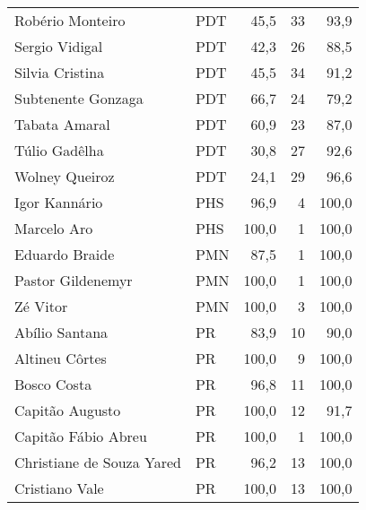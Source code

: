 \begin{longtable}{llrrr}
                    Robério Monteiro &            PDT &      45,5 &           33 &       93,9 \\
                      Sergio Vidigal &            PDT &      42,3 &           26 &       88,5 \\
                     Silvia Cristina &            PDT &      45,5 &           34 &       91,2 \\
                  Subtenente Gonzaga &            PDT &      66,7 &           24 &       79,2 \\
                       Tabata Amaral &            PDT &      60,9 &           23 &       87,0 \\
                       Túlio Gadêlha &            PDT &      30,8 &           27 &       92,6 \\
                      Wolney Queiroz &            PDT &      24,1 &           29 &       96,6 \\
                       Igor Kannário &            PHS &      96,9 &            4 &      100,0 \\
                         Marcelo Aro &            PHS &     100,0 &            1 &      100,0 \\
                      Eduardo Braide &            PMN &      87,5 &            1 &      100,0 \\
                   Pastor Gildenemyr &            PMN &     100,0 &            1 &      100,0 \\
                            Zé Vitor &            PMN &     100,0 &            3 &      100,0 \\
                      Abílio Santana &             PR &      83,9 &           10 &       90,0 \\
                      Altineu Côrtes &             PR &     100,0 &            9 &      100,0 \\
                         Bosco Costa &             PR &      96,8 &           11 &      100,0 \\
                     Capitão Augusto &             PR &     100,0 &           12 &       91,7 \\
                 Capitão Fábio Abreu &             PR &     100,0 &            1 &      100,0 \\
           Christiane de Souza Yared &             PR &      96,2 &           13 &      100,0 \\
                      Cristiano Vale &             PR &     100,0 &           13 &      100,0 \\

\end{longtable}
